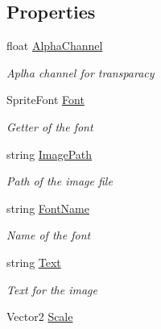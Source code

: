 \subsection*{Properties}
\begin{DoxyCompactItemize}
\item 
float \hyperlink{class_hel_project_1_1_u_i_1_1_image_a88c8f934be50346b0c1fcdb125c5f3ce}{Alpha\+Channel}
\begin{DoxyCompactList}\small\item\em Aplha channel for transparacy \end{DoxyCompactList}\item 
Sprite\+Font \hyperlink{class_hel_project_1_1_u_i_1_1_image_a6e25ee935e6d96933d122abe14980378}{Font}
\begin{DoxyCompactList}\small\item\em Getter of the font \end{DoxyCompactList}\item 
string \hyperlink{class_hel_project_1_1_u_i_1_1_image_a500e6631592affa3501b85c8399f4ee5}{Image\+Path}
\begin{DoxyCompactList}\small\item\em Path of the image file \end{DoxyCompactList}\item 
string \hyperlink{class_hel_project_1_1_u_i_1_1_image_ae5b5c6f2347963176eff641b8a725485}{Font\+Name}
\begin{DoxyCompactList}\small\item\em Name of the font \end{DoxyCompactList}\item 
string \hyperlink{class_hel_project_1_1_u_i_1_1_image_a5ee12296f31949495524fba982677dc4}{Text}
\begin{DoxyCompactList}\small\item\em Text for the image \end{DoxyCompactList}\item 
Vector2 \hyperlink{class_hel_project_1_1_u_i_1_1_image_aaee02769150fffb97a56c2883b679054}{Scale}

\end{DoxyCompactItemize}
